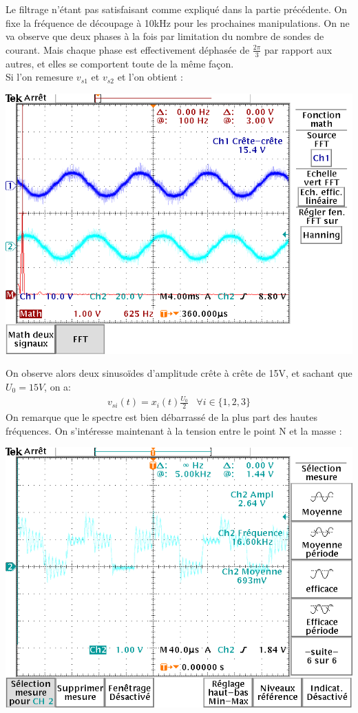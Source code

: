 \documentclass[10pt,a4paper]{article}
\begin{document}
	Le filtrage n'étant pas satisfaisant comme expliqué dans la partie précédente. On fixe la fréquence de découpage à 10kHz pour les prochaines manipulations. On ne va observe que deux phases à la fois par limitation du nombre de sondes de courant. Mais chaque phase est effectivement déphasée de $\frac{2\pi}{3}$ par rapport aux autres, et elles se comportent toute de la même façon.\\
	Si l'on remesure $v_{s1}$ et $v_{s2}$ et l'on obtient :
	\begin{center}
	\includegraphics[scale=0.4]{triphase_vs12_10k.png}
	\end{center}
	On observe alors deux sinusoïdes d'amplitude crête à crête de 15V, et sachant que $U_0=15V$, on a:
	\[\begin{matrix}v_{si}(t)=x_i(t)\frac{U_0}{2} &\forall i \in \{1,2,3\}\end{matrix}\]
	On remarque que le spectre est bien débarrassé de la plus part des hautes fréquences.
	\bigbreak
	\bigbreak
	On s'intéresse maintenant à la tension entre le point N et la masse :
	\begin{center}
	\includegraphics[scale=0.4]{v0n.png}
	\end{center}
\end{document}
